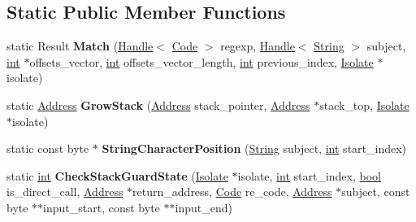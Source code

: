 \subsection*{Static Public Member Functions}
\begin{DoxyCompactItemize}
\item 
\mbox{\label{classv8_1_1internal_1_1NativeRegExpMacroAssembler_adf3c85eed3ff0ba2abc1f455bca600be}} 
static Result {\bfseries Match} (\mbox{\hyperlink{classv8_1_1internal_1_1Handle}{Handle}}$<$ \mbox{\hyperlink{classv8_1_1internal_1_1Code}{Code}} $>$ regexp, \mbox{\hyperlink{classv8_1_1internal_1_1Handle}{Handle}}$<$ \mbox{\hyperlink{classv8_1_1internal_1_1String}{String}} $>$ subject, \mbox{\hyperlink{classint}{int}} $\ast$offsets\+\_\+vector, \mbox{\hyperlink{classint}{int}} offsets\+\_\+vector\+\_\+length, \mbox{\hyperlink{classint}{int}} previous\+\_\+index, \mbox{\hyperlink{classv8_1_1internal_1_1Isolate}{Isolate}} $\ast$isolate)
\item 
\mbox{\label{classv8_1_1internal_1_1NativeRegExpMacroAssembler_a473d8e744726a35090f726c48927985c}} 
static \mbox{\hyperlink{classuintptr__t}{Address}} {\bfseries Grow\+Stack} (\mbox{\hyperlink{classuintptr__t}{Address}} stack\+\_\+pointer, \mbox{\hyperlink{classuintptr__t}{Address}} $\ast$stack\+\_\+top, \mbox{\hyperlink{classv8_1_1internal_1_1Isolate}{Isolate}} $\ast$isolate)
\item 
\mbox{\label{classv8_1_1internal_1_1NativeRegExpMacroAssembler_a0f81f5766a87b4260c1917cd322ad781}} 
static const byte $\ast$ {\bfseries String\+Character\+Position} (\mbox{\hyperlink{classv8_1_1internal_1_1String}{String}} subject, \mbox{\hyperlink{classint}{int}} start\+\_\+index)
\item 
\mbox{\label{classv8_1_1internal_1_1NativeRegExpMacroAssembler_a57bfd27bee98c37c8007408c8326a1b0}} 
static \mbox{\hyperlink{classint}{int}} {\bfseries Check\+Stack\+Guard\+State} (\mbox{\hyperlink{classv8_1_1internal_1_1Isolate}{Isolate}} $\ast$isolate, \mbox{\hyperlink{classint}{int}} start\+\_\+index, \mbox{\hyperlink{classbool}{bool}} is\+\_\+direct\+\_\+call, \mbox{\hyperlink{classuintptr__t}{Address}} $\ast$return\+\_\+address, \mbox{\hyperlink{classv8_1_1internal_1_1Code}{Code}} re\+\_\+code, \mbox{\hyperlink{classuintptr__t}{Address}} $\ast$subject, const byte $\ast$$\ast$input\+\_\+start, const byte $\ast$$\ast$input\+\_\+end)

\end{DoxyCompactItemize}
